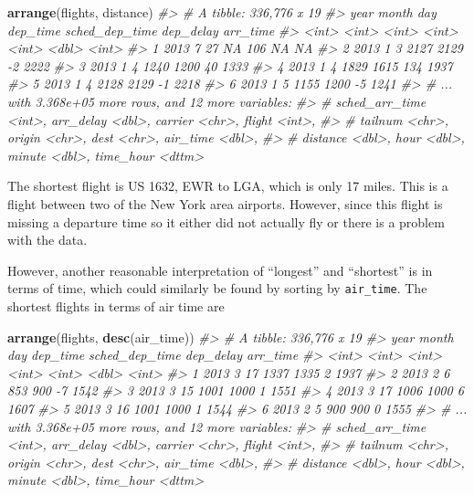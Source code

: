 \documentclass[]{book}
\newenvironment{Shaded}{\begin{snugshade}}{\end{snugshade}}
\newcommand{\CommentTok}[1]{\textcolor[rgb]{0.56,0.35,0.01}{\textit{#1}}}
\newcommand{\KeywordTok}[1]{\textcolor[rgb]{0.13,0.29,0.53}{\textbf{#1}}}
\newcommand{\NormalTok}[1]{#1}
\theoremstyle{plain}
\theoremstyle{remark}
\begin{document}
\begin{Shaded}
\begin{Highlighting}[]
\KeywordTok{arrange}\NormalTok{(flights, distance)}
\CommentTok{#> # A tibble: 336,776 x 19}
\CommentTok{#>    year month   day dep_time sched_dep_time dep_delay arr_time}
\CommentTok{#>   <int> <int> <int>    <int>          <int>     <dbl>    <int>}
\CommentTok{#> 1  2013     7    27       NA            106        NA       NA}
\CommentTok{#> 2  2013     1     3     2127           2129        -2     2222}
\CommentTok{#> 3  2013     1     4     1240           1200        40     1333}
\CommentTok{#> 4  2013     1     4     1829           1615       134     1937}
\CommentTok{#> 5  2013     1     4     2128           2129        -1     2218}
\CommentTok{#> 6  2013     1     5     1155           1200        -5     1241}
\CommentTok{#> # ... with 3.368e+05 more rows, and 12 more variables:}
\CommentTok{#> #   sched_arr_time <int>, arr_delay <dbl>, carrier <chr>, flight <int>,}
\CommentTok{#> #   tailnum <chr>, origin <chr>, dest <chr>, air_time <dbl>,}
\CommentTok{#> #   distance <dbl>, hour <dbl>, minute <dbl>, time_hour <dttm>}
\end{Highlighting}
\end{Shaded}

The shortest flight is US 1632, EWR to LGA, which is only 17 miles. This
is a flight between two of the New York area airports. However, since
this flight is missing a departure time so it either did not actually
fly or there is a problem with the data.

However, another reasonable interpretation of ``longest'' and
``shortest'' is in terms of time, which could similarly be found by
sorting by \texttt{air\_time}. The shortest flights in terms of air time
are

\begin{Shaded}
\begin{Highlighting}[]
\KeywordTok{arrange}\NormalTok{(flights, }\KeywordTok{desc}\NormalTok{(air_time))}
\CommentTok{#> # A tibble: 336,776 x 19}
\CommentTok{#>    year month   day dep_time sched_dep_time dep_delay arr_time}
\CommentTok{#>   <int> <int> <int>    <int>          <int>     <dbl>    <int>}
\CommentTok{#> 1  2013     3    17     1337           1335         2     1937}
\CommentTok{#> 2  2013     2     6      853            900        -7     1542}
\CommentTok{#> 3  2013     3    15     1001           1000         1     1551}
\CommentTok{#> 4  2013     3    17     1006           1000         6     1607}
\CommentTok{#> 5  2013     3    16     1001           1000         1     1544}
\CommentTok{#> 6  2013     2     5      900            900         0     1555}
\CommentTok{#> # ... with 3.368e+05 more rows, and 12 more variables:}
\CommentTok{#> #   sched_arr_time <int>, arr_delay <dbl>, carrier <chr>, flight <int>,}
\CommentTok{#> #   tailnum <chr>, origin <chr>, dest <chr>, air_time <dbl>,}
\CommentTok{#> #   distance <dbl>, hour <dbl>, minute <dbl>, time_hour <dttm>}
\end{Highlighting}
\end{Shaded}
\end{document}
